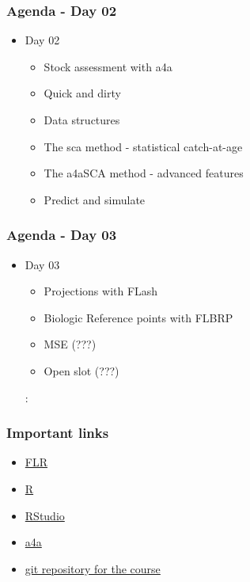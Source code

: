 \documentclass{beamer}%
\begin{document}
\begin{frame}
   \frametitle{Agenda - Day 02}
	\begin{itemize}
	 	\item Day 02
	 	\begin{itemize}
		 	\item Stock assessment with a4a
		 	\item Quick and dirty
		 	\item Data structures
		 	\item The sca method - statistical catch-at-age
		 	\item The a4aSCA method - advanced features
		 	\item Predict and simulate
		 \end{itemize}
	\end{itemize}
\end{frame}

\begin{frame}
   \frametitle{Agenda - Day 03}
	\begin{itemize}
		 \item Day 03
		 \begin{itemize}
			 \item Projections with FLash
			 \item Biologic Reference points with FLBRP
			 \item MSE (???)
			 \item Open slot (???)
		 \end{itemize}:
	\end{itemize}
\end{frame}

\begin{frame}
   \frametitle{Important links}
	\begin{itemize}
		 \item \href{http://flr-project.org}{FLR}
		 \item \href{http://r-project.org}{R}
		 \item \href{https://www.rstudio.com/}{RStudio}
		 \item \href{https://fishreg.jrc.ec.europa.eu/web/a4a}{a4a}
		 \item \href{https://github.com/a4a/2014-CEFAS-crse}{git repository for the course}
	\end{itemize}
\end{frame}
\end{document}
